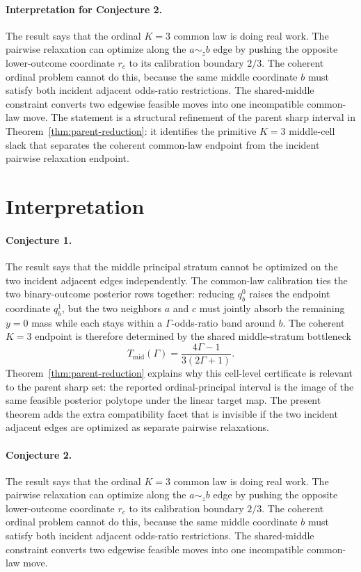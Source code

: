 \documentclass[11pt]{article}
\theoremstyle{definition}
\theoremstyle{plain}
\theoremstyle{remark}
\begin{document}
\paragraph{Interpretation for Conjecture 2.}
The result says that the ordinal \(K=3\) common law is doing real work.  The pairwise relaxation can optimize along the \(a\sim_z b\) edge by pushing the opposite lower-outcome coordinate \(r_c\) to its calibration boundary \(2/3\).  The coherent ordinal problem cannot do this, because the same middle coordinate \(b\) must satisfy both incident adjacent odds-ratio restrictions.  The shared-middle constraint converts two edgewise feasible moves into one incompatible common-law move.  The statement is a structural refinement of the parent sharp interval in Theorem~\ref{thm:parent-reduction}: it identifies the primitive \(K=3\) middle-cell slack that separates the coherent common-law endpoint from the incident pairwise relaxation endpoint.

\section{Interpretation}
\paragraph{Conjecture 1.}
The result says that the middle principal stratum cannot be optimized on the two incident adjacent edges independently.  The common-law calibration ties the two binary-outcome posterior rows together: reducing \(q_b^0\) raises the endpoint coordinate \(q_b^1\), but the two neighbors \(a\) and \(c\) must jointly absorb the remaining \(y=0\) mass while each stays within a \(\Gamma\)-odds-ratio band around \(b\).  The coherent \(K=3\) endpoint is therefore determined by the shared middle-stratum bottleneck
\[
  T_{\mathrm{mid}}(\Gamma)=\frac{4\Gamma-1}{3(2\Gamma+1)}.
\]
Theorem~\ref{thm:parent-reduction} explains why this cell-level certificate is relevant to the parent sharp set: the reported ordinal-principal interval is the image of the same feasible posterior polytope under the linear target map.  The present theorem adds the extra compatibility facet that is invisible if the two incident adjacent edges are optimized as separate pairwise relaxations.

\paragraph{Conjecture 2.}
The result says that the ordinal \(K=3\) common law is doing real work.  The pairwise relaxation can optimize along the \(a\sim_z b\) edge by pushing the opposite lower-outcome coordinate \(r_c\) to its calibration boundary \(2/3\).  The coherent ordinal problem cannot do this, because the same middle coordinate \(b\) must satisfy both incident adjacent odds-ratio restrictions.  The shared-middle constraint converts two edgewise feasible moves into one incompatible common-law move.
\end{document}
